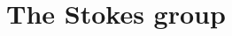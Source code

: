 \begin{comment}
      \textbf{``\Leftarrow{}'':}
      If for some suitable covering $(I_j)$ the cocycle $(\lambda_{jl})$ is a
      coboundary with values in $\Aut_\cA(\tilde\cM^{nf})$, i.e.\
      $\lambda_{jl}=f_lf_j^{-1}$, we define a new connection $\nabla$ on
      $\tilde\cM^{nf}$ by conjugating $\nabla^{nf}$ by $f_j$ on $U_j$.

      \TODO{}

      Moreover $\hat f_j=\hat f_l$ on $U_j\cap U_l$, so that the formal
      isomorphisms
      \[
        \hat f_j:(\hat \cM^{nf},\nabla)
        \overset{\sim}{\longrightarrow}
        (\hat\cM^{nf},\nabla^{nf})
      \]
      can be glued in an isomorphism $\hat f:(\hat \cM^{nf},\nabla)
      \overset{\sim}{\longrightarrow}(\hat\cM^{nf},\nabla^{nf})$.
    \end{proof}

    Thus, the proof of~\ref{thm:mainThm1} is a consequence of the following
    theorem by Malgrange and Sibuya.
    \begin{thm}[Malgrange-Sibuya]\label{thm:malgSibuyaHelp}
      \marginnote{\cite[Thm.II.6.10]{sabbah2007isomonodromic}}
      The image of the mapping
      \[
        H^1(S^1,\Gl_d^{<0}(\cA_{\tilde D}))
        \to
        H^1(H^1,\Gl_d(\cA_{\tilde D}))
      \]
      is the identity.
    \end{thm}
    For the proof of Theorem~\ref{thm:malgSibuyaHelp} which we refer to
    \cite[Th.A.1]{Malgrange1983}, \cite[Th.6.4.1]{sibuya1990Linear} and
    \cite{babbitt1989local}.
  \end{proof}
\end{comment}
\fi

\section{The Stokes group}\label{sec:StokesGroup}

